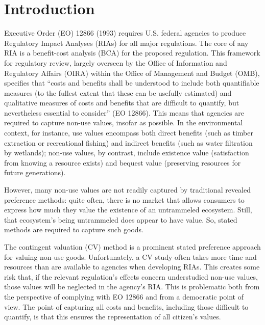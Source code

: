 \documentclass[12pt]{article}
\begin{document}
\section{Introduction}\label{sec:intro}
Executive Order (EO) 12866 (1993) requires U.S. federal agencies to produce Regulatory Impact Analyses (RIAs) for all major regulations. The core of any RIA is a benefit-cost analysis (BCA) for the proposed regulation. This framework for regulatory review, largely overseen by the Office of Information and Regulatory Affairs (OIRA) within the Office of Management and Budget (OMB), specifies that “costs and benefits shall be understood to include both quantifiable measures (to the fullest extent that these can be usefully estimated) and qualitative measures of costs and benefits that are difficult to quantify, but nevertheless essential to consider” (EO 12866). This means that agencies are required to capture non-use values, insofar as possible. In the environmental context, for instance, use values encompass both direct benefits (such as timber extraction or recreational fishing) and indirect benefits (such as water filtration by wetlands); non-use values, by contrast, include existence value (satisfaction from knowing a resource exists) and bequest value (preserving resources for future generations). 

However, many non-use values are not readily captured by traditional revealed preference methods: quite often, there is no market that allows consumers to express how much they value the existence of an untrammeled ecosystem. Still, that ecosystem’s being untrammeled does appear to have value. So, stated methods are required to capture such goods. 

The contingent valuation (CV) method is a prominent stated preference approach for valuing non-use goods. Unfortunately, a CV study often takes more time and resources than are available to agencies when developing RIAs. This creates some risk that, if the relevant regulation’s effects concern understudied non-use values, those values will be neglected in the agency’s RIA. This is problematic both from the perspective of complying with EO 12866 and from a democratic point of view. The point of capturing all costs and benefits, including those difficult to quantify, is that this ensures the representation of all citizen’s values.
\end{document}
